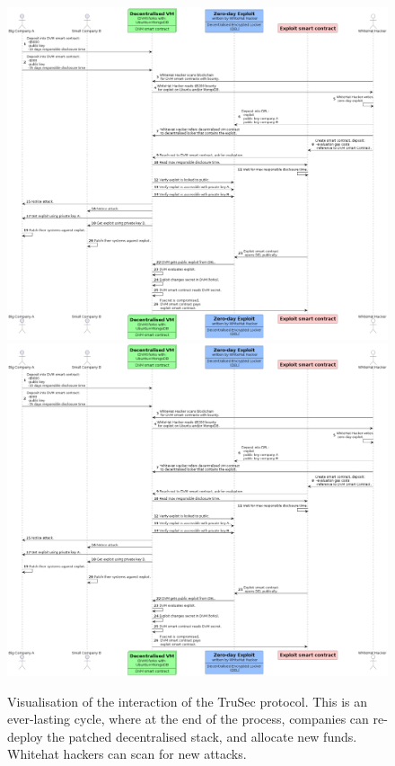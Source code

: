 \begin{figure}[H]
    \centering
    \ifx\homepath\overleafhome
        \includegraphics[width=1.0\textwidth]{Images/Diagrams/interaction.png}
    \else
        \includegraphics[width=1.0\textwidth]{latex/Images/Diagrams/interaction.png}
    \fi
    
    \caption{Visualisation of the interaction of the TruSec protocol. This is an ever-lasting cycle, where at the end of the process, companies can re-deploy the patched decentralised stack, and allocate new funds. Whitehat hackers can scan for new attacks.}
    \label{fig:interaction}
\end{figure}
\noindent 




